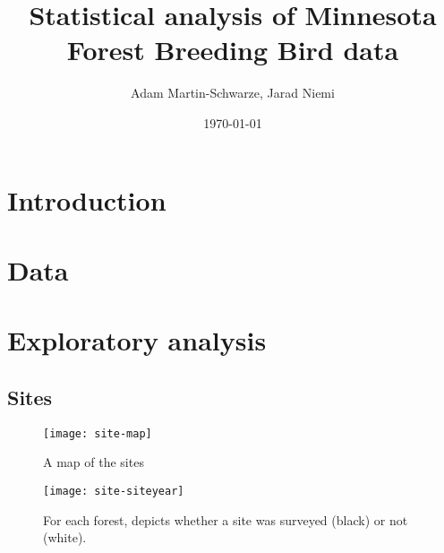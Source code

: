 \documentclass{article}
\title{Statistical analysis of Minnesota Forest Breeding Bird data}
\author{Adam Martin-Schwarze, Jarad Niemi}
\date{\today}
\begin{document}
\maketitle
\tableofcontents
\newpage


\section{Introduction}



\section{Data} 



\section{Exploratory analysis}

\subsection{Sites}






\begin{figure}
\texttt{[image: site-map]}
\caption{A map of the sites}
\label{fig:site-map}
\end{figure}


\begin{figure}
\texttt{[image: site-siteyear]}
\caption{For each forest, depicts whether a site was surveyed (black) or not (white).}
\label{fig:site-siteyear}
\end{figure}
\end{document}
